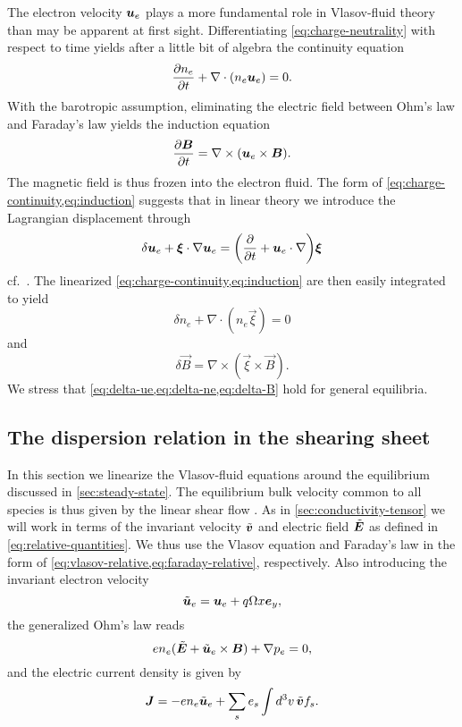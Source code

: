 \documentclass[aps,pre,notitlepage,amsmath,amssymb,amsfonts,nobibnotes,nofootinbib,superscriptaddress]{revtex4-1}
\begin{document}
The electron velocity $\bm{u}_e$ plays a more fundamental role in Vlasov-fluid
theory than may be apparent at first sight. Differentiating
\cref{eq:charge-neutrality} with respect to time yields after a little bit of
algebra the continuity equation
\begin{equation}
  \label{eq:charge-continuity}
  \pder{n_e}{t} + \nabla\cdot(n_e\vec{u}_e) = 0.
\end{equation}
With the barotropic assumption, eliminating the electric field between Ohm's
law and Faraday's law yields the induction equation
\begin{equation}
  \label{eq:induction}
  \pder{\vec{B}}{t} = \nabla\times(\vec{u}_e\times\vec{B}).
\end{equation}
The magnetic field is thus frozen into the electron fluid. The form of
\cref{eq:charge-continuity,eq:induction} suggests that in linear theory we
introduce the Lagrangian displacement through
\begin{equation}
  \label{eq:delta-ue}
  \delta\ue + \vec{\xi}\cdot\nabla\ue =
  \left(\pder{}{t} + \ue\cdot\nabla\right)\vec{\xi}
\end{equation}
cf.\ \citet{Lynden-Bell1967,Friedman1978}. The linearized
\cref{eq:charge-continuity,eq:induction} are then easily integrated to yield
\begin{equation}
  \label{eq:delta-ne}
  \delta n_e + \nabla\cdot(n_e\vec{\xi}) = 0
\end{equation}
and
\begin{equation}
  \label{eq:delta-B}
  \delta\vec{B} = \nabla\times(\vec{\xi}\times\vec{B}).
\end{equation}
We stress that \cref{eq:delta-ue,eq:delta-ne,eq:delta-B} hold for general
equilibria.

\subsection{The dispersion relation in the shearing sheet}

In this section we linearize the Vlasov-fluid equations around the equilibrium
discussed in \cref{sec:steady-state}. The equilibrium bulk velocity common to
all species is thus given by the linear shear flow .
As in \cref{sec:conductivity-tensor} we will work in terms of the invariant
velocity $\tilde{\bm{v}}$ and electric field $\tilde{\bm{E}}$ as defined in
\cref{eq:relative-quantities}. We thus use the Vlasov equation and Faraday's
law in the form of \cref{eq:vlasov-relative,eq:faraday-relative},
respectively. Also introducing the invariant electron velocity
\begin{equation}
  \tilde{\bm{u}}_e = \bm{u}_e + q\Omega x\bm{e}_y,
\end{equation}
the generalized Ohm's law reads
\begin{equation}
  \label{eq:ohms-law-relative}
  e n_e(\tvec{E} + \tue\times\vec{B}) + \nabla\pe = 0,
\end{equation}
and the electric current density is given by
\begin{equation}
  \label{eq:ampere-relative}
  \vec{J} = -en_e\tilde{\vec{u}}_e + \sums \qs\int d^3v\,\tvec{v} f_s.
\end{equation}
\end{document}
